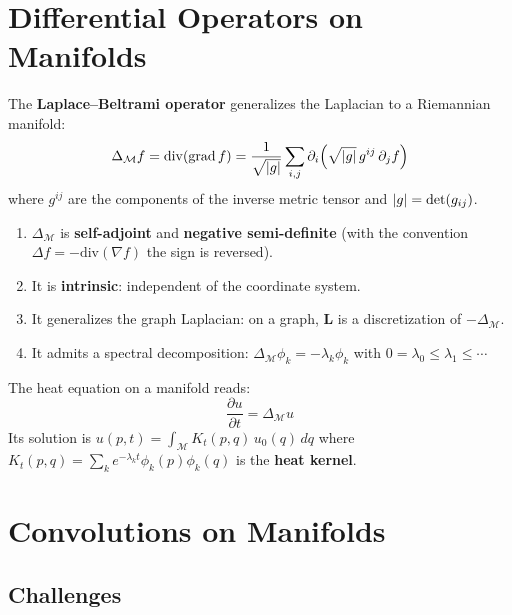 \section{Differential Operators on Manifolds}

\begin{definition}
The \textbf{Laplace--Beltrami operator} generalizes the Laplacian to a
Riemannian manifold:
\[
    \Delta_{\mathcal{M}} f = \mathrm{div}(\mathrm{grad}\, f)
    = \frac{1}{\sqrt{\left| g \right|}} \sum_{i,j} \partial_i\!\left(\sqrt{\left| g \right|}\,
    g^{ij}\, \partial_j f\right)
\]
where $g^{ij}$ are the components of the inverse metric tensor and
$\left| g \right| = \det(g_{ij})$.
\end{definition}

\begin{theorem}
\begin{enumerate}
    \item $\Delta_{\mathcal{M}}$ is \textbf{self-adjoint} and \textbf{negative semi-definite}
          (with the convention $\Delta f = -\mathrm{div}(\nabla f)$ the sign is reversed).
    \item It is \textbf{intrinsic}: independent of the coordinate system.
    \item It generalizes the graph Laplacian: on a graph, $\mathbf{L}$ is a
          discretization of $-\Delta_{\mathcal{M}}$.
    \item It admits a spectral decomposition:
          $\Delta_{\mathcal{M}} \phi_k = -\lambda_k \phi_k$ with
          $0 = \lambda_0 \leq \lambda_1 \leq \cdots$
\end{enumerate}
\end{theorem}

\begin{proposition}
The heat equation on a manifold reads:
\[
    \frac{\partial u}{\partial t} = \Delta_{\mathcal{M}} u
\]
Its solution is $u(p, t) = \int_{\mathcal{M}} K_t(p, q)\, u_0(q)\, dq$ where
$K_t(p,q) = \sum_k e^{-\lambda_k t} \phi_k(p) \phi_k(q)$ is the
\textbf{heat kernel}.
\end{proposition}

\section{Convolutions on Manifolds}

\subsection{Challenges}

